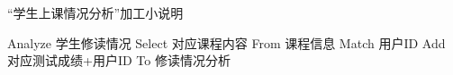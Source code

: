 \begin{algorithm}[H]
    \renewcommand{\thealgorithm}{}
    \caption{“学生上课情况分析”加工小说明} 
    \label{alg3} 
    \begin{algorithmic}[1]
        \STATE Analyze 学生修读情况
        \STATE Select 对应课程内容 From 课程信息 Match 用户ID
        \STATE Add 对应测试成绩+用户ID To 修读情况分析
        \ENDFOR
    \end{algorithmic} 
\end{algorithm}